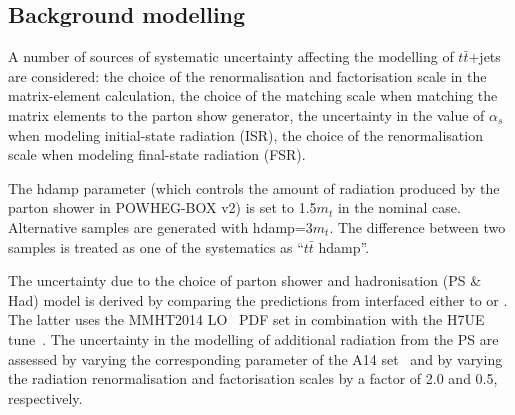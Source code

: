\documentclass[PAPER, coverpage, atlasdraft=true, texlive=2016, UKenglish]{\ATLASLATEXPATH atlasdoc}
\begin{document}
\subsection{Background modelling}
\label{sec:syst_bkgmodeling}

A number of sources of systematic uncertainty affecting the modelling of $t\bar{t}$+jets are considered: the choice of the renormalisation and factorisation scale in the matrix-element calculation, the choice of the matching scale when matching the matrix elements to the parton show generator, the uncertainty in the value of $\alpha_s$ when modeling initial-state radiation (ISR), the choice of the renormalisation scale when modeling final-state radiation (FSR).

The hdamp parameter (which controls the amount of radiation produced by the parton shower in
POWHEG-BOX v2) is set to 1.5$m_t$ in the nominal case. Alternative samples are generated with hdamp=3$m_t$. The
difference between two samples is treated as one of the systematics as ``$t\bar{t}$ hdamp''. 

The uncertainty due to the choice of parton shower and hadronisation (PS \& Had) model is derived 
by comparing the predictions from {\powheg} interfaced either to {\pythiaeight} or {}.
The latter uses the MMHT2014 LO~\cite{Harland-Lang:2014zoa} PDF set in combination with the H7UE tune~\cite{Bellm:2015jjp}.
The uncertainty in the modelling of additional radiation from the PS are assessed by
varying the corresponding parameter of the A14 set~\cite{ATL-PHYS-PUB-2016-004} and by varying the radiation renormalisation and factorisation scales
by a factor of 2.0 and 0.5, respectively. 
\end{document}
